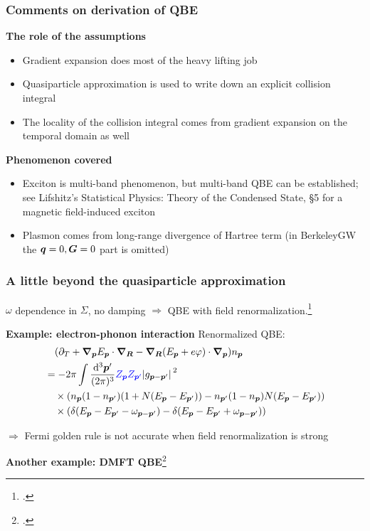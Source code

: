 \documentclass[t]{beamer}
\begin{document}
\begin{frame}
\frametitle{Comments on derivation of QBE}

\textbf{The role of the assumptions}

\begin{itemize}
    \item Gradient expansion does most of the heavy lifting job
    \item Quasiparticle approximation is used to write down 
        an explicit collision integral 
    \item The locality of the collision integral comes from 
        gradient expansion on the temporal domain as well 
\end{itemize} 

\textbf{Phenomenon covered}

\begin{itemize}
    \item Exciton is multi-band phenomenon, but 
        multi-band QBE can be established; 
        see Lifshitz's Statistical Physics: Theory of the Condensed State, \S 5 
        for a magnetic field-induced exciton 
    \item Plasmon comes from long-range divergence of Hartree term
        (in BerkeleyGW the $\vb*{q} = 0, \vb*{G} = 0$ part is omitted)
\end{itemize}    

\end{frame}

\begin{frame}
\frametitle{A little beyond the quasiparticle approximation}

$\omega$ dependence in $\Sigma$,
no damping 
$\Rightarrow$ QBE with field renormalization.\footcite{rammer1986quantum}

\vspace{0.25cm}

\textbf{Example: electron-phonon interaction } Renormalized QBE:
\begin{equation}
    \begin{aligned}
        &\quad (\partial_T + \grad_{\vb*{p}} E_{\vb*{p}} \cdot \grad_{\vb*{R}}
        - \grad_{\vb*{R}} (E_{\vb*{p}} + e \varphi) \cdot \grad_{\vb*{p}}) n_{\vb*{p}} \\
        &= - 2 \pi \int \frac{\dd[3]{\vb*{p}'}}{(2\pi)^3} 
        \textcolor{blue}{Z_{\vb*{p}} Z_{\vb*{p}'}}
        \abs*{g_{\vb*{p} - \vb*{p}'}}^2 \\
        &\quad \times (n_{\vb*{p}} (1 - n_{\vb*{p}'}) (1 + N(E_{\vb*{p}} - E_{\vb*{p}'}))
        - n_{\vb*{p}'} (1 - n_{\vb*{p}}) N(E_{\vb*{p}} - E_{\vb*{p}'})) \\
        &\quad \times (\delta(E_{\vb*{p}} - E_{\vb*{p}'} - \omega_{\vb*{p} - \vb*{p}'})
        - \delta(E_{\vb*{p}} - E_{\vb*{p}'} + \omega_{\vb*{p} - \vb*{p}'}))
    \end{aligned}
\end{equation}

$\Rightarrow$ Fermi golden rule is not accurate when field renormalization is strong

\textbf{Another example: DMFT QBE}\footcite{wais2018quantum}

\end{frame}
\end{document}
